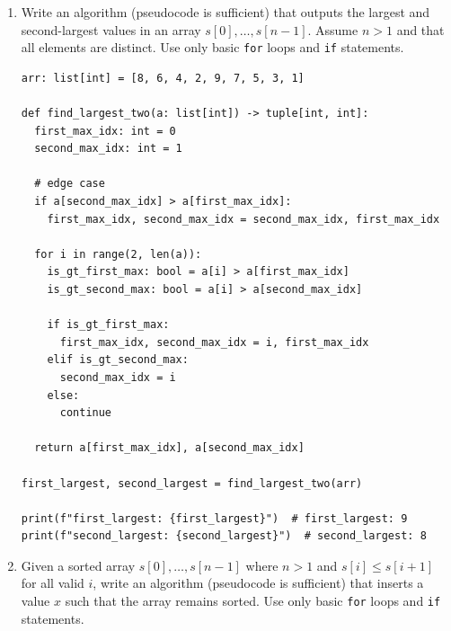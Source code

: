 \documentclass[12pt]{scrartcl}
\begin{document}
\begin{enumerate}[label=\textbf{\arabic*.}]
\begin{lstlisting}
  for i in range(0, n):
    left = i
    right = (len(a) - i) - 1
    
    a[left], a[right] = a[right], a[left]

  return a

print(reverse(arr)) # [1, 2, 3, 4, 5, 6, 7, 8, 9, 10]
\end{lstlisting}

	      \newpage
	\item
	      Write an algorithm (pseudocode is sufficient) that outputs the largest and second-largest values in an array \( s[0], \ldots, s[n-1] \).
	      Assume \( n > 1 \) and that all elements are distinct.
	      Use only basic \texttt{for} loops and \texttt{if} statements.

	      \vspace{0.3cm}
	      \begin{lstlisting}
arr: list[int] = [8, 6, 4, 2, 9, 7, 5, 3, 1]

def find_largest_two(a: list[int]) -> tuple[int, int]:
  first_max_idx: int = 0
  second_max_idx: int = 1

  # edge case
  if a[second_max_idx] > a[first_max_idx]:
    first_max_idx, second_max_idx = second_max_idx, first_max_idx

  for i in range(2, len(a)):
    is_gt_first_max: bool = a[i] > a[first_max_idx]
    is_gt_second_max: bool = a[i] > a[second_max_idx]

    if is_gt_first_max:
      first_max_idx, second_max_idx = i, first_max_idx
    elif is_gt_second_max:
      second_max_idx = i
    else:
      continue

  return a[first_max_idx], a[second_max_idx]

first_largest, second_largest = find_largest_two(arr)

print(f"first_largest: {first_largest}")  # first_largest: 9
print(f"second_largest: {second_largest}")  # second_largest: 8
\end{lstlisting}

	      \newpage
	\item
	      Given a sorted array \( s[0], \ldots, s[n-1] \) where \( n > 1 \) and \( s[i] \leq s[i+1] \) for all valid \( i \),
	      write an algorithm (pseudocode is sufficient) that inserts a value \( x \) such that the array remains sorted.
	      Use only basic \texttt{for} loops and \texttt{if} statements.


\end{enumerate}
\end{document}
